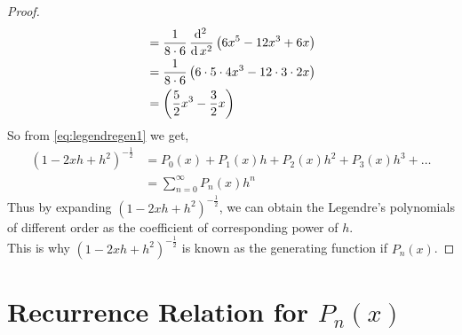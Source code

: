 \documentclass[../main-sheet.tex]{subfiles}
\begin{document}
\begin{proof}
\begin{align*}
        &=\frac{1}{8\cdot 6}\,\frac{\mathrm{d}^{2}\, }{\mathrm{d}\, x^{2}}\left(6x^5-12x^3+6x\right)\\
        &=\frac{1}{8\cdot 6}\left(6\cdot5\cdot4x^3-12\cdot3\cdot2x\right)\\
        &=\left(\frac{5}{2}x^3-\frac{3}{2}x\right)
    \end{align*}
    So from \eqref{eq:legendregen1} we get,
    \begin{align*}
        \left(1-2xh+h^2\right)^{-\frac{1}{2}}&=P_0(x)+P_1(x)h+P_2(x)h^2+P_3(x)h^3+\dots\\
        &=\sum_{n=0}^{\infty}P_n(x)h^n
    \end{align*}
    Thus by expanding $ \left(1-2xh+h^2\right)^{-\frac{1}{2}} $, we can obtain the Legendre's polynomials of different order as the coefficient of corresponding  power of $ h $.\\
    This is why $ \left(1-2xh+h^2\right)^{-\frac{1}{2}} $ is known as the generating function if $ P_n(x) $.
\end{proof}

\section{Recurrence Relation for $ P_n(x) $}
\end{document}
